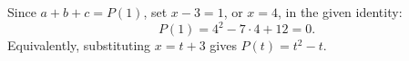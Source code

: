 Since $a+b+c=P(1)$, set $x-3=1$, or $x=4$, in the given identity:
\[
P(1)=4^2-7\cdot4+12=\boxed0.
\]
Equivalently, substituting $x=t+3$ gives $P(t)=t^2-t$.
